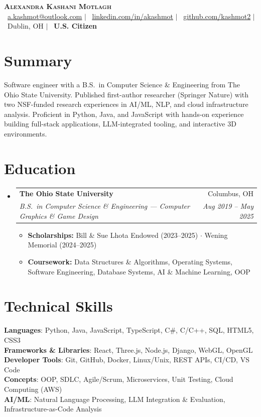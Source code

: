 \documentclass[letterpaper,10.5pt]{article}
\makeatletter
\newcommand{\resumeItem}[1]{
  \item\small{
    {#1 \vspace{-2pt}}
  }
}
\newcommand{\resumeSubheading}[4]{
  \vspace{-2pt}\item
    \begin{tabular*}{0.97\textwidth}[t]{l@{\extracolsep{\fill}}r}
      \textbf{#1} & #2 \\
      \textit{\small#3} & \textit{\small #4} \\
    \end{tabular*}\vspace{-7pt}
}
\newcommand{\resumeSubHeadingListStart}{\begin{itemize}[leftmargin=0.15in, label={}]}
\newcommand{\resumeSubHeadingListEnd}{\end{itemize}}
\newcommand{\resumeItemListStart}{\begin{itemize}}
\newcommand{\resumeItemListEnd}{\end{itemize}\vspace{-5pt}}
\makeatother
\begin{document}
\begin{center}
    {\Huge \scshape \textbf{Alexandra Kashani Motlagh}} \\ \vspace{3pt}
    \small
    \faEnvelope\ \href{mailto:a.kashmot@outlook.com}{\underline{a.kashmot@outlook.com}} $|$
    \faLinkedin\ \href{https://linkedin.com/in/akashmot}{\underline{linkedin.com/in/akashmot}} $|$
    \faGithub\ \href{https://github.com/kashmot2}{\underline{github.com/kashmot2}} $|$
    \faMapMarkerAlt\ Dublin, OH $|$
    \faFlag\ \textbf{U.S. Citizen}
\end{center}

\vspace{-2pt}

\section{Summary}
  \small{Software engineer with a B.S.\ in Computer Science \& Engineering from The Ohio State University.
  Published first-author researcher (Springer Nature) with two NSF-funded research experiences
  in AI/ML, NLP, and cloud infrastructure analysis. Proficient in Python, Java, and JavaScript
  with hands-on experience building full-stack applications, LLM-integrated tooling, and interactive 3D environments.}

\section{Education}
  \resumeSubHeadingListStart
    \resumeSubheading
      {The Ohio State University}{Columbus, OH}
      {B.S.\ in Computer Science \& Engineering --- Computer Graphics \& Game Design}{Aug 2019 -- May 2025}
      \resumeItemListStart
        \resumeItem{\textbf{Scholarships:} Bill \& Sue Lhota Endowed (2023--2025) $\cdot$ Wening Memorial (2024--2025)}
        \resumeItem{\textbf{Coursework:} Data Structures \& Algorithms, Operating Systems, Software Engineering, Database Systems, AI \& Machine Learning, OOP}
      \resumeItemListEnd
  \resumeSubHeadingListEnd

\section{Technical Skills}
 \begin{itemize}[leftmargin=0.15in, label={}]
    \small{\item{
     \textbf{Languages}{: Python, Java, JavaScript, TypeScript, C\#, C/C++, SQL, HTML5, CSS3} \\
     \textbf{Frameworks \& Libraries}{: React, Three.js, Node.js, Django, WebGL, OpenGL} \\
     \textbf{Developer Tools}{: Git, GitHub, Docker, Linux/Unix, REST APIs, CI/CD, VS Code} \\
     \textbf{Concepts}{: OOP, SDLC, Agile/Scrum, Microservices, Unit Testing, Cloud Computing (AWS)} \\
     \textbf{AI/ML}{: Natural Language Processing, LLM Integration \& Evaluation, Infrastructure-as-Code Analysis}
    }}
 \end{itemize}
\end{document}
